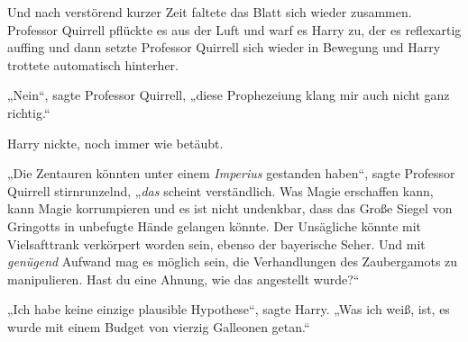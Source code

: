 Und nach verstörend kurzer Zeit faltete das Blatt sich wieder zusammen. Professor Quirrell pflückte es aus der Luft und warf es Harry zu, der es reflexartig auffing und dann setzte Professor Quirrell sich wieder in Bewegung und Harry trottete automatisch hinterher.

„Nein“, sagte Professor Quirrell, „diese Prophezeiung klang mir auch nicht ganz richtig.“

Harry nickte, noch immer wie betäubt.

„Die Zentauren könnten unter einem \emph{Imperius} gestanden haben“, sagte Professor Quirrell stirnrunzelnd,
„\emph{das} scheint verständlich. Was Magie erschaffen kann, kann Magie korrumpieren und es ist nicht undenkbar, dass das Große Siegel von Gringotts in unbefugte Hände gelangen könnte. Der Unsägliche könnte mit Vielsafttrank verkörpert worden sein, ebenso der bayerische Seher.%
Und mit \emph{genügend} Aufwand mag es möglich sein, die Verhandlungen des Zaubergamots zu manipulieren. Hast du eine Ahnung, wie das angestellt wurde?“

„Ich habe keine einzige plausible Hypothese“, sagte Harry.
„Was ich weiß, ist, es wurde mit einem Budget von vierzig Galleonen getan.“

